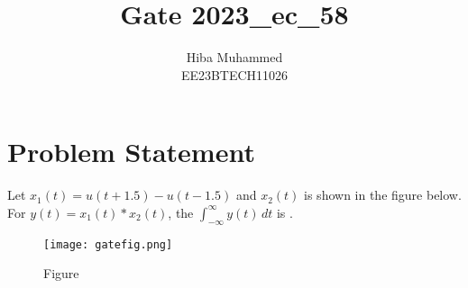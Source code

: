 \documentclass[12pt]{article}
\title{Gate 2023\_ec\_58}
\author{Hiba Muhammed \\
        EE23BTECH11026}
\begin{document}
\maketitle

\section*{Problem Statement}

Let $x_1(t) = u(t + 1.5) - u(t - 1.5)$ and $x_2(t)$ is shown in the figure below. For $y(t) = x_1(t) * x_2(t)$, the $\int_{-\infty}^{\infty} y(t) \, dt$ is \underline{\hspace{2cm}}.

\begin{figure}[htbp]
    \centering
    \texttt{[image: gatefig.png]}
    \caption{Figure}
    \label{fig:graph}
\end{figure}
\end{document}
